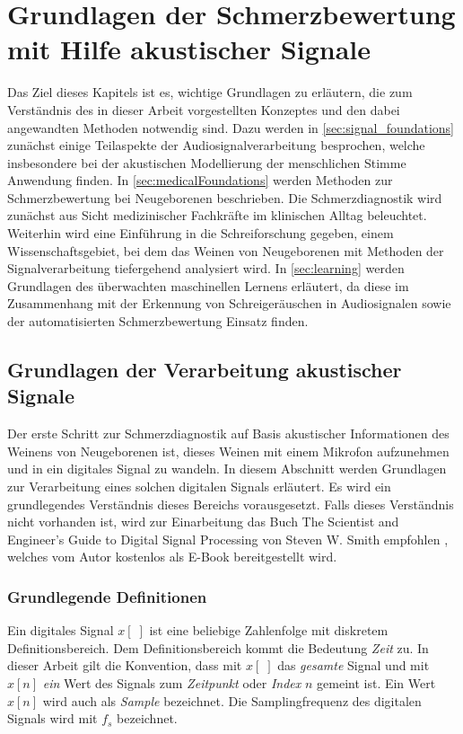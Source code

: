 \chapter{Grundlagen der Schmerzbewertung mit Hilfe akustischer Signale}
\label{sec:foundations}

Das Ziel dieses Kapitels ist es, wichtige Grundlagen zu erläutern, die zum Verständnis des in dieser Arbeit vorgestellten Konzeptes und den dabei angewandten Methoden notwendig sind. Dazu werden in \autoref{sec:signal_foundations} zunächst einige Teilaspekte der Audiosignalverarbeitung besprochen, welche insbesondere bei der akustischen Modellierung der menschlichen Stimme Anwendung finden. In \autoref{sec:medicalFoundations} werden Methoden zur Schmerzbewertung bei Neugeborenen beschrieben. Die Schmerzdiagnostik wird zunächst aus Sicht medizinischer Fachkräfte im klinischen Alltag beleuchtet. Weiterhin wird eine Einführung in die \glqq Schreiforschung\grqq{} gegeben, einem Wissenschaftsgebiet, bei dem das Weinen von Neugeborenen mit Methoden der Signalverarbeitung tiefergehend analysiert wird. In \autoref{sec:learning} werden Grundlagen des überwachten maschinellen Lernens erläutert, da diese im Zusammenhang mit der Erkennung von Schreigeräuschen in Audiosignalen sowie der automatisierten Schmerzbewertung Einsatz finden.

\section{Grundlagen der Verarbeitung akustischer Signale}
\label{sec:signal_foundations}

Der erste Schritt zur Schmerzdiagnostik auf Basis akustischer Informationen des Weinens von Neugeborenen ist, dieses Weinen mit einem Mikrofon aufzunehmen und in ein digitales Signal zu wandeln. In diesem Abschnitt werden Grundlagen zur Verarbeitung eines solchen digitalen Signals erläutert. Es wird ein grundlegendes Verständnis dieses Bereichs vorausgesetzt. Falls dieses Verständnis nicht vorhanden ist, wird zur Einarbeitung das Buch \glqq The Scientist and Engineer's Guide to Digital Signal Processing\grqq{} von Steven W. Smith empfohlen \cite{dspGuide}, welches vom Autor kostenlos als E-Book bereitgestellt wird.

\subsection{Grundlegende Definitionen}

Ein digitales Signal $x[\;]$ ist eine beliebige Zahlenfolge mit diskretem Definitionsbereich. Dem Definitionsbereich kommt die Bedeutung \emph{Zeit} zu.\cite[S. 11-12]{dspGuide} In dieser Arbeit gilt die Konvention, dass mit $x[\;]$ das \emph{gesamte} Signal und mit $x[n]$ \emph{ein} Wert des Signals zum \emph{Zeitpunkt} oder \emph{Index} $n$ gemeint ist. Ein Wert $x[n]$ wird auch als \emph{Sample} bezeichnet. Die Samplingfrequenz des digitalen Signals wird mit $f_s$ bezeichnet.

